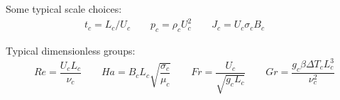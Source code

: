 \documentclass[11pt]{article}
\begin{document}
Some typical scale choices:
\begin{equation}\begin{aligned}
	t_c = L_c/ U_c \qquad
	p_c = \rho_c U_c^2 \qquad
	J_c = U_c \sigma_c B_c \qquad
\end{aligned}\end{equation}

Typical dimensionless groups:
\begin{equation}
	Re = \frac{U_c L_c}{\nu_c} \qquad
	Ha = B_c L_c \sqrt{\frac{\sigma_c}{\mu_c}} \qquad
	Fr = \frac{U_c}{\sqrt{g_c L_c}} \qquad
	Gr = \frac{g_c \beta \Delta T_c L_c^3}{\nu_c^2}
\end{equation}
\end{document}
